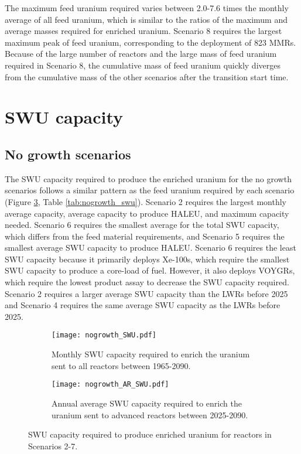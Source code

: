 The maximum feed uranium required varies between 2.0-7.6 times the monthly 
average of all feed uranium, which is similar to the ratios of the 
maximum and average masses required for enriched uranium. Scenario 8 
requires the largest maximum peak of 
feed uranium, corresponding to the deployment of 823 \glspl{MMR}. Because 
of 
the large number of reactors and the large mass of feed uranium required 
in Scenario 8, the cumulative mass of feed uranium quickly diverges from 
the cumulative mass of the other scenarios after the transition start time. 

\section{SWU capacity}
\subsection{No growth scenarios} \label{sec:nogrowth_swu}
The \gls{SWU} capacity required to produce the enriched uranium for 
the no growth scenarios follows a similar pattern as 
the feed uranium required by each scenario (Figure \ref{fig:nogrowth_swu}, 
Table \ref{tab:nogrowth_swu}). Scenario 2 requires the largest monthly 
average capacity, average capacity to produce \gls{HALEU}, and maximum 
capacity needed. Scenario 6 requires the smallest average for the total 
\gls{SWU} capacity, which differs from the feed material requirements, 
and Scenario 5 requires the smallest average 
\gls{SWU} capacity to produce \gls{HALEU}. Scenario 6 requires the least 
\gls{SWU} capacity because it primarily deploys Xe-100s, which require the 
smallest \gls{SWU} capacity to produce a core-load of fuel. However, it 
also deploys VOYGRs, which require the lowest product assay to decrease the 
\gls{SWU} capacity required. 
Scenario 2 requires a larger average \gls{SWU} capacity 
than the \glspl{LWR} before 2025 and Scenario 4 requires the same average 
\gls{SWU} capacity as the \glspl{LWR} before 2025. 

\begin{figure}
    \centering
    \begin{subfigure}[b]{0.45\textwidth}
        \centering
        \texttt{[image: nogrowth\_SWU.pdf]}
        \caption{Monthly \gls{SWU} capacity required to enrich the  
        uranium sent to all reactors between 1965-2090.}
        \label{fig:nogrowth_all_SWU}
    \end{subfigure}
    \hfill
    \begin{subfigure}[b]{0.45\textwidth}
        \centering
        \texttt{[image: nogrowth\_AR\_SWU.pdf]}
        \caption{Annual average \gls{SWU} capacity required to enrich 
        the uranium sent to advanced reactors between 2025-2090.}
        \label{fig:nogrowth_AR_SWU}
    \end{subfigure}
       \caption{\gls{SWU} capacity required to produce enriched uranium 
       for reactors in Scenarios 2-7.}
       \label{fig:nogrowth_swu}
\end{figure}

